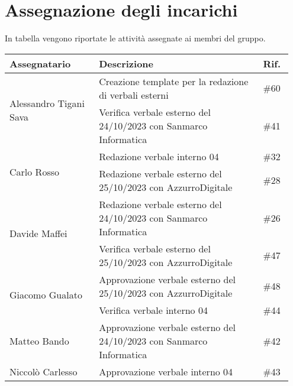 \section{Assegnazione degli incarichi}
In tabella vengono riportate le attività assegnate ai membri del gruppo.
\begin{center}
    {
    \renewcommand{\arraystretch}{1.5}
    \begin{tabular}{p{0.30\linewidth}|p{0.55\linewidth}|p{0.10\linewidth}}
		\textbf{Assegnatario}   		&   \textbf{Descrizione}   & \textbf{Rif.}     \\
		\hline
		\multirow{2}{*}{Alessandro Tigani Sava}			
										& Creazione template per la redazione di verbali esterni				& \#60	\\
		\cline{2-3}
										& Verifica verbale esterno del 24/10/2023 con Sanmarco Informatica      & \#41 	\\
		\hline
		\multirow{2}{*}{Carlo Rosso}	& Redazione verbale interno 04											& \#32 	\\
		\cline{2-3}
										& Redazione verbale esterno del 25/10/2023 con AzzurroDigitale	        & \#28 	\\
		\hline
		\multirow{2}{*}{Davide Maffei}	& Redazione verbale esterno del 24/10/2023 con Sanmarco Informatica	    & \#26 	\\
		\cline{2-3}
										& Verifica verbale esterno del 25/10/2023 con AzzurroDigitale           & \#47 	\\
		\hline
		\multirow{2}{*}{Giacomo Gualato}
										& Approvazione verbale esterno del 25/10/2023 con AzzurroDigitale	    & \#48 	\\
		\cline{2-3}
										& Verifica verbale interno 04											& \#44 	\\
		\hline
		Matteo Bando
										& Approvazione verbale esterno del 24/10/2023 con Sanmarco Informatica	& \#42 	\\
		\hline
		Niccolò Carlesso				& Approvazione verbale interno 04										& \#43 	\\
    \end{tabular}
    }
\end{center}
